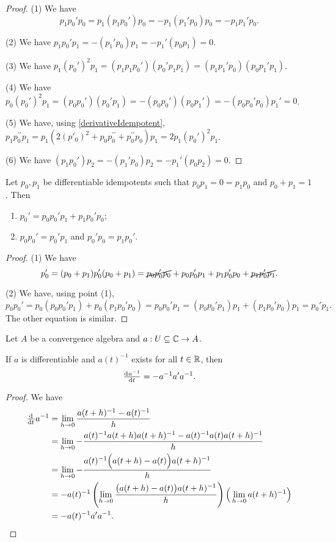 \begin{proof}
(1) We have
\[ p_1p_0'p_0 = p_1(p_1p_0')p_0 = -p_1(p_1'p_0)p_0 = -p_1p_1'p_0. \]

(2) We have $p_1p_0'p_1 = -(p_1'p_0)p_1 = -p_1'(p_0p_1) = 0$.

(3) We have $p_1(p_0')^2p_1 = (p_1p_1p_0')(p_0'p_1p_1) = (p_1p_1'p_0)(p_0p_1'p_1)$.

(4) We have $p_0(p_0')^2p_1 = (p_0p_0')(p_0'p_1) = -(p_0p_0')(p_0p_1') = -(p_0p_0'p_0)p_1' = 0$.

(5) We have, using \ref{derivativeIdempotent}, $p_1p^{\prime\prime}_0p_1 = p_1(2(p'_0)^2 + p_0p_0^{\prime\prime} + p_0^{\prime\prime}p_0)p_1 = 2p_1(p_0')^2p_1$.

(6) We have $(p_1p_0')p_2 = - (p_1'p_0)p_2 = - p_1'(p_0p_2) = 0$.
\end{proof}
\begin{corollary} \label{derivativeIdempotentOffDiagonal}
Let $p_0,p_1$ be differentiable idempotents such that $p_0p_1 = 0 = p_1p_0$ and $p_0 + p_1 = 1$. Then
\begin{enumerate}
\item $p_0' = p_0p_0'p_1 + p_1p_0'p_0$;
\item $p_0p_0' = p_0'p_1$ and $p_0'p_0 = p_1p_0'$.
\end{enumerate}
\end{corollary}
\begin{proof}
(1) We have
\[ p_0' = (p_0 + p_1)p_0'(p_0 + p_1) = \cancel{p_0p_0'p_0} + p_0p_0'p_1 + p_1p_0'p_0 + \cancel{p_1p_0'p_1}. \]

(2) We have, using point (1),
\[ p_0p_0' = p_0(p_0p_0'p_1) + p_0(p_1p_0'p_0) = p_0p_0'p_1 = (p_0p_0'p_1)p_1 + (p_1p_0'p_0)p_1 = p_0'p_1. \]
The other equation is similar.
\end{proof}


\begin{proposition}
Let $A$ be a convergence algebra and $a: U\subseteq\mathbb{C} \to A$.

If $a$ is differentiable and $a(t)^{-1}$ exists for all $t\in \mathbb{R}$, then
\[ \od{a^{-1}}{t} = -a^{-1}a'a^{-1}. \]
\end{proposition}
\begin{proof}
We have
\begin{align*}
\od{}{t}a^{-1} &= \lim_{h\to 0}\frac{a(t+h)^{-1} - a(t)^{-1}}{h} \\
&= \lim_{h\to 0} -\frac{a(t)^{-1}a(t+h)a(t+h)^{-1} - a(t)^{-1}a(t)a(t+h)^{-1}}{h} \\
&= \lim_{h\to 0} -\frac{a(t)^{-1}\Big(a(t+h) - a(t)\Big)a(t+h)^{-1}}{h} \\
&= -a(t)^{-1}\left(\lim_{h\to 0}\frac{\big(a(t+h) - a(t)\big)a(t+h)^{-1}}{h}\right)\Big(\lim_{h\to 0}a(t+h)^{-1}\Big) \\
&= -a(t)^{-1}a'a^{-1}.
\end{align*}
\end{proof}

